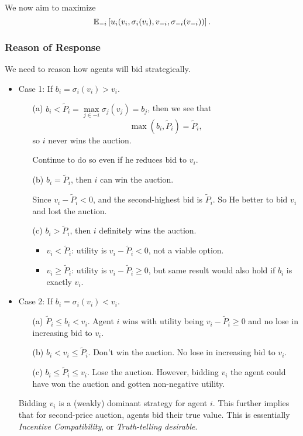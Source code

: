We now aim to maximize
\[
	\mathbb{\MakeUppercase{E}}_{-i}\left[u_{i}(v_{i}, \sigma_{i}(v_{i}), v_{-i}, \sigma_{-i}(v_{-i}))\right].
\]

\subsubsection{Reason of Response}
We need to reason how agents will bid strategically.
\begin{itemize}
	\item Case 1: If \(b_{i} = \sigma_{i}(v_{i})>v_{i}\).
	      \begin{enumerate}
		      \item[(a)] \(b_{i}< \widetilde{P}_i = \max\limits_{j\in -i}\sigma_{j}(v_{j}) = b_{j}\), then we see that
			      \[
				      \max(b_{i}, \widetilde{P}_{i}) = \widetilde{P}_{i},
			      \]
			      so \(i\) never wins the auction.
			      \par Continue to do so even if he reduces bid to \(v_{i}\).
		      \item[(b)] \(b_{i} = \widetilde{P}_{i}\), then \(i\) can win the auction.
			      \par Since \(v_{i} - \widetilde{P}_{i}<0\),  and the second-highest bid is \(\widetilde{P}_{i}\). So He better to bid \(v_{i}\) and
			      lost the auction.
		      \item[(c)] \(b_{i} > \widetilde{P}_{i}\), then \(i\) definitely wins the auction.
			      \begin{itemize}
				      \item \(v_{i}<\widetilde{P}_{i}\): utility is \(v_{i} - \widetilde{P}_{i}<0\), not a viable option.
				      \item \(v_{i}\geq \widetilde{P}_{i}\): utility is \(v_{i} - \widetilde{P}_{i}\geq 0\), but
				            same result would also hold if \(b_{i}\) is exactly \(v_{i}\).
			      \end{itemize}
	      \end{enumerate}
	\item Case 2: If \(b_{i} = \sigma_{i}(v_{i})<v_{i}\).
	      \begin{enumerate}
		      \item[(a)] \(\widetilde{P}_{i}\leq b_{i}<v_{i}\). Agent \(i\) wins with utility being \(v_{i} - \widetilde{P}_{i}\geq 0\) and
			      no lose in increasing bid to \(v_{i}\).
		      \item[(b)] \(b_{i}< v_{i}\leq \widetilde{P}_{i}\). Don't win the auction. No lose in increasing bid to \(v_{i}\).
		      \item[(c)] \(b_{i}\leq \widetilde{P}_{i}\leq v_{i}\). Lose the auction. However, bidding \(v_{i}\) the agent could have won the
			      auction and gotten non-negative utility.
	      \end{enumerate}
	      \begin{remark}
		      Bidding \(v_i\) is a (weakly) dominant strategy for agent \(i\). This further implies that for second-price auction, agents
		      bid their true value. This is essentially \emph{Incentive Compatibility}, or \emph{Truth-telling desirable}.
	      \end{remark}
\end{itemize}

